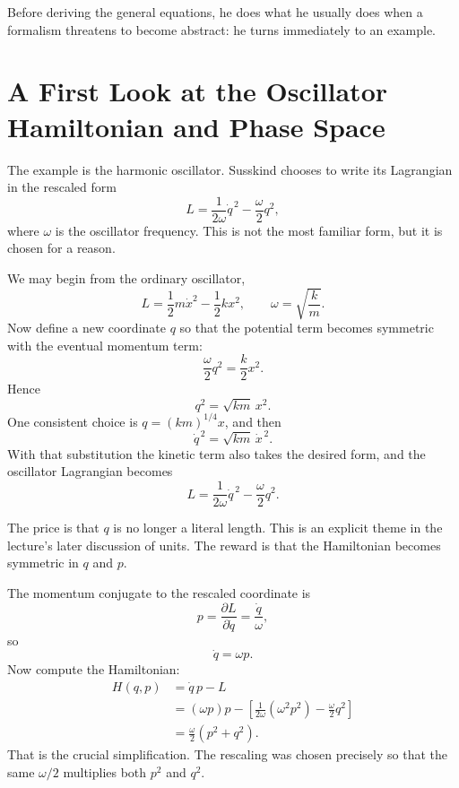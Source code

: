 Before deriving the general equations, he does what he usually does when a formalism threatens to become abstract: he turns immediately to an example.

\section{A First Look at the Oscillator Hamiltonian and Phase Space}

The example is the harmonic oscillator. Susskind chooses to write its Lagrangian in the rescaled form
\begin{equation}
L=\frac{1}{2\omega}\dot q^{\,2}-\frac{\omega}{2}q^2,
\end{equation}
where \(\omega\) is the oscillator frequency. This is not the most familiar form, but it is chosen for a reason.

We may begin from the ordinary oscillator,
\begin{equation}
L=\frac12 m\dot x^2-\frac12 kx^2,\qquad \omega=\sqrt{\frac{k}{m}}.
\end{equation}
Now define a new coordinate \(q\) so that the potential term becomes symmetric with the eventual momentum term:
\begin{equation}
\frac{\omega}{2}q^2=\frac{k}{2}x^2.
\end{equation}
Hence
\begin{equation}
q^2=\sqrt{km}\,x^2.
\end{equation}
One consistent choice is \(q=(km)^{1/4}x\), and then
\begin{equation}
\dot q^{\,2}=\sqrt{km}\,\dot x^{\,2}.
\end{equation}
With that substitution the kinetic term also takes the desired form, and the oscillator Lagrangian becomes
\begin{equation}
L=\frac{1}{2\omega}\dot q^{\,2}-\frac{\omega}{2}q^2.
\end{equation}

The price is that \(q\) is no longer a literal length. This is an explicit theme in the lecture's later discussion of units. The reward is that the Hamiltonian becomes symmetric in \(q\) and \(p\).

The momentum conjugate to the rescaled coordinate is
\begin{equation}
p=\frac{\partial L}{\partial \dot q}=\frac{\dot q}{\omega},
\end{equation}
so
\begin{equation}
\dot q=\omega p.
\end{equation}
Now compute the Hamiltonian:
\begin{align}
H(q,p)
&=\dot q\,p-L \\
&=(\omega p)p-\left[\frac{1}{2\omega}(\omega^2p^2)-\frac{\omega}{2}q^2\right] \\
&=\frac{\omega}{2}(p^2+q^2).
\end{align}
That is the crucial simplification. The rescaling was chosen precisely so that the same \(\omega/2\) multiplies both \(p^2\) and \(q^2\).

